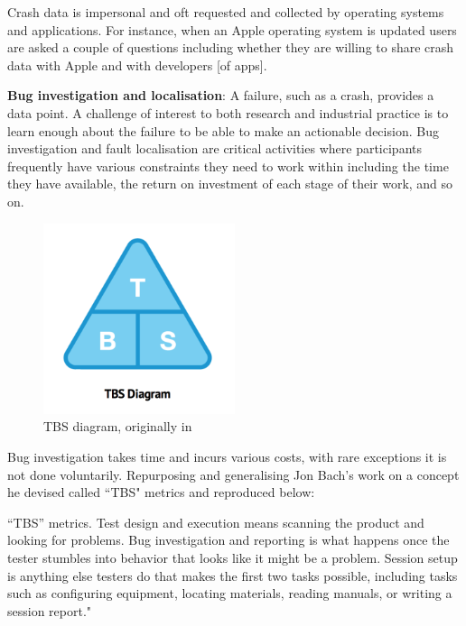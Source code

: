 
Crash data is impersonal and oft requested and collected by operating systems and applications. For instance, when an Apple operating system is updated users are asked a couple of questions including whether they are willing to share crash data with Apple and with developers [of apps].

\textbf{Bug investigation and localisation}: A failure, such as a crash, provides a data point. A challenge of interest to both research and industrial practice is to learn enough about the failure to be able to make an actionable decision. Bug investigation and fault localisation 
are critical activities where participants frequently have various constraints they need to work within including the time they have available, the return on investment of each stage of their work, and so on.

\begin{figure}
    \centering
    \includegraphics[width = 0.5\textwidth]{images/mobile-analytics-playbook/TBS.png}
    \caption{TBS diagram, originally in~\citep{harty_aymer_playbook_2016}}
    \label{fig:my_tbs_diagram}
\end{figure}

Bug investigation takes time and incurs various costs, with rare exceptions it is not done voluntarily. Repurposing and generalising Jon Bach's work on a concept he devised called ``TBS" metrics and reproduced below:

“TBS” metrics. Test design and execution means scanning the product and looking for problems. Bug investigation and reporting is what happens once the tester stumbles into behavior that looks like it might be a problem. Session setup is anything else testers do that makes the first two tasks possible, including tasks such as configuring equipment, locating materials, reading manuals, or writing a session report."~\citep{bach2000_sbtm}

